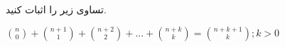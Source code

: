 \p
تساوی زیر را اثبات کنید. 
\\
\centerline{${n \choose 0} + {{n+1} \choose 1} + {{n+2} \choose 2} + ... + {{n+k} \choose k} = {{n+k+1} \choose k} ; k > 0$}\\